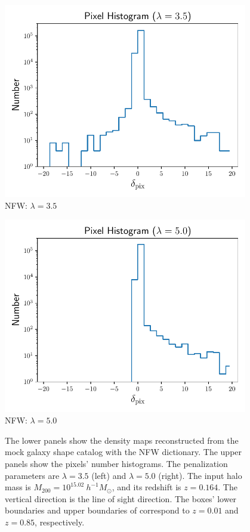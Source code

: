 \begin{figure}[!t]
\begin{minipage}[c]{1.0\columnwidth}
\includegraphics[width=0.95\textwidth]{pixel_histograms_halo17_NFW_lbd35.pdf}
    \centering
    \small NFW: $\lambda=3.5$
\end{minipage}
\begin{minipage}[c]{1.0\columnwidth}
\includegraphics[width=0.95\textwidth]{pixel_histograms_halo17_NFW_lbd50.pdf}
    \centering
    \small
    NFW: $\lambda=5.0$
\end{minipage}
\caption{The lower panels show the density maps reconstructed from the mock
    galaxy shape catalog with the NFW dictionary. The upper panels show the
    pixels' number histograms.  The penalization parameters are $\lambda=3.5$
    (left) and $\lambda=5.0$ (right).  The input halo mass is
    $M_{200}=10^{15.02} ~h^{-1}M_{\odot}$, and its redshift is $z=0.164$.  The
    vertical direction is the line of sight direction. The boxes' lower
    boundaries and upper boundaries of correspond to $z=0.01$ and $z=0.85$,
    respectively.
    } \label{fig_NFW3D}
\end{figure}

